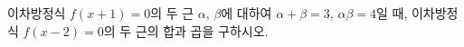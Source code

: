 이차방정식 $f(x+1)=0$의 두 근 $\alpha$, $\beta$에 대하여 $\alpha+\beta=3$, $\alpha\beta=4$일 때, 이차방정식 $f(x-2)=0$의 두 근의 합과 곱을 구하시오.
